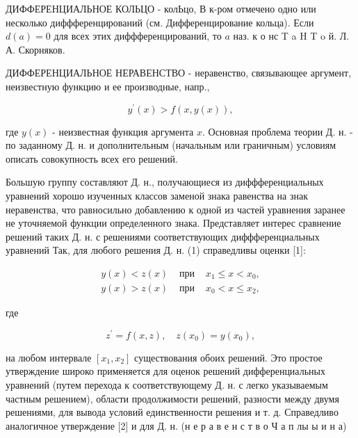 \documentclass[10pt]{article}
\begin{document}
ДИФФЕРЕНЦИАЛЬНОЕ КОЛЬЦО - колЬцо, В к-ром отмечено одно или несколько диффференцирований (см. Дифференцирование кольца). Если $d(a)=0$ для всех этих диффференцирований, то $a$ наз. к о нс T a H T o й. Л. А. Скорняков.



ДИФФЕРЕНЦИАЛЬНОЕ НЕРАВЕНСТВО - неравенство, связывающее аргумент, неизвестную функцию и ее производные, напр.,



\[

y^{\prime}(x)>f(x, y(x)),

\]



где $y(x)$ - неизвестная функция аргумента $x$. Основная проблема теории Д. н. - по заданному Д. н. и дополнительным (начальным или граничным) условиям описать совокупность всех его решений.



Большую группу составляют Д. н., получающиеся из диффференциальных уравнений хорошо изученных классов заменой знака равенства на знак неравенства, что равносильно добавлению к одной из частей уравнения заранее не уточняемой функции определенного знака. Представляет интерес сравнение решений таких Д. н. с решениями соответствующих диффференциальных уравнений Так, для любого решения Д. н. (1) справедливы оценки [1]:



\[

\begin{array}{lll}

y(x)<z(x) & \text { при } & x_{1} \leqslant x<x_{0}, \\

y(x)>z(x) & \text { при } & x_{0}<x \leqslant x_{2},

\end{array}

\]



где



\[

z^{\prime}=f(x, z), \quad z\left(x_{0}\right)=y\left(x_{0}\right),

\]



на любом интервале $\left[x_{1}, x_{2}\right]$ существования обоих решений. Это простое утверждение широко применяется для оценок решений дифференциальных уравнений (путем перехода к соответствующему Д. н. с легко указываемым частным решением), области продолжимости решений, разности между двумя решениями, для вывода условий единственности решения и т. д. Справедливо аналогичное утверждение [2] и для Д. н. (н е р а в е н с т в о Ч а п лы ы и н а)
\end{document}
